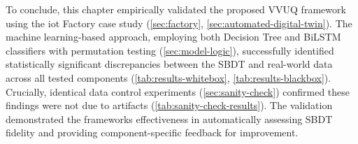 To conclude, this chapter empirically validated the proposed VVUQ framework using the \gls{iot} Factory case study (\autoref{sec:factory}, \autoref{sec:automated-digital-twin}). The machine learning-based approach, employing both Decision Tree and BiLSTM classifiers with permutation testing (\autoref{sec:model-logic}), successfully identified statistically significant discrepancies between the SBDT and real-world data across all tested components (\autoref{tab:results-whitebox}, \autoref{tab:results-blackbox}). Crucially, identical data control experiments (\autoref{sec:sanity-check}) confirmed these findings were not due to artifacts (\autoref{tab:sanity-check-results}). The validation demonstrated the frameworks effectiveness in automatically assessing SBDT fidelity and providing component-specific feedback for improvement.